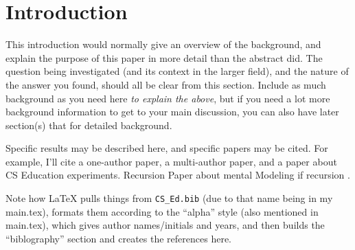 \section{Introduction}

This introduction would normally give an overview of the background,
and explain the purpose of this paper in more detail than the abstract did.
The question being investigated (and its context in the larger field),
and the nature of the answer you found,
should all be clear from this section.
Include as much background as you need here {\em to explain the above},
but if you need a lot more background information to get to your main discussion,
you can also have later section(s) that for detailed background.


Specific results may be described here, and specific papers may be cited.
For example, I'll cite a one-author paper\cite{DuBoulay:Notional86},
a multi-author paper\cite{TFK:Recursion18},
and a paper about CS Education experiments\cite{FTR:Design11}.
Recursion Paper about mental Modeling if recursion \cite{GSG:Recursion03}.

Note how LaTeX pulls things from {\tt CS\_Ed.bib} (due to that name being in my main.tex), 
formats them according to the ``alpha'' style (also mentioned in main.tex), which gives author names/initials and years,
and then builds the ``biblography'' section and creates the
references here.
